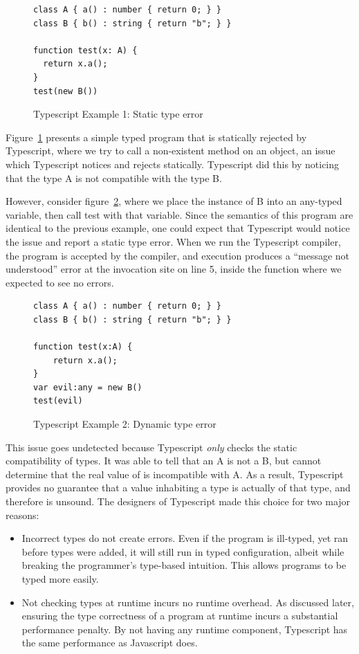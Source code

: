 \documentclass[a4paper,USenglish]{tex/lipics-v2016}
\begin{document}
\begin{figure}[h]
\begin{verbatim}
class A { a() : number { return 0; } }
class B { b() : string { return "b"; } }

function test(x: A) {
  return x.a();
}
test(new B())
\end{verbatim}
\caption{Typescript Example 1: Static type error}
\label{fig:tsex1}
\end{figure}

Figure~\ref{fig:tsex1} presents a simple typed program that is statically 
rejected by Typescript, where we try to call a non-existent method on an object,
an issue which Typescript notices and rejects statically. Typescript did this
by noticing that the type A is not compatible with the type B.

However, consider figure~\ref{fig:tsex2}, where we place the instance of B
into an any-typed variable, then call test with that variable. Since the
semantics of this program are identical to the previous example, one could
expect that Typescript would notice the issue and report a static type
error. When we run the Typescript compiler, the program is accepted by the
compiler, and execution produces a ``message not understood'' error at the
invocation site on line 5, inside the function where we expected to see no
errors.

\begin{figure}[h]
\begin{verbatim}
class A { a() : number { return 0; } }
class B { b() : string { return "b"; } }

function test(x:A) {
	return x.a();
}
var evil:any = new B()
test(evil)
\end{verbatim}
\caption{Typescript Example 2: Dynamic type error}
\label{fig:tsex2}
\end{figure}

This issue goes undetected because Typescript \emph{only} checks the static
compatibility of types. It was able to tell that an A is not a B, but cannot
determine that the real value of  is incompatible with A. As a
result, Typescript provides no guarantee that a value inhabiting a type is
actually of that type, and therefore is unsound. The designers of Typescript
made this choice for two major reasons:

\begin{itemize}
\item Incorrect types do not create errors. Even if the program is
  ill-typed, yet ran before types were added, it will still run in typed
  configuration, albeit while breaking the programmer's type-based
  intuition. This allows programs to be typed more easily.
\item Not checking types at runtime incurs no runtime overhead. As discussed
  later, ensuring the type correctness of a program at runtime incurs a
  substantial performance penalty. By not having any runtime component,
  Typescript has the same performance as Javascript does.
\end{itemize}
\end{document}
